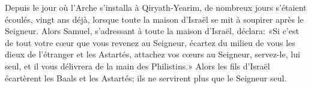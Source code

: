 Depuis le jour où l’Arche s’installa à Qiryath-Yearim,
	de nombreux jours s’étaient écoulés, vingt ans déjà,
	lorsque toute la maison d’Israël se mit à soupirer après le Seigneur.
Alors Samuel, s’adressant à toute la maison d’Israël, déclara:
	«Si c’est de tout votre cœur que vous revenez au Seigneur,
	écartez du milieu de vous les dieux de l’étranger et les Astartés,
	attachez vos cœurs au Seigneur, servez-le, lui seul,
	et il vous délivrera de la main des Philistins.»
Alors les fils d’Israël écartèrent les Baals et les Astartés;
	ils ne servirent plus que le Seigneur seul.
